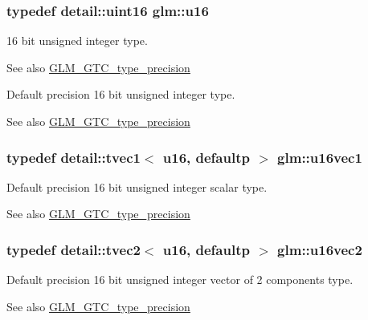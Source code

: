 \subsubsection[{\texorpdfstring{u16}{u16}}]{\setlength{\rightskip}{0pt plus 5cm}typedef detail\+::uint16 {\bf glm\+::u16}}\hypertarget{group__gtc__type__precision_gae7a1571503f83d2264ddfa705a6b082a}{}\label{group__gtc__type__precision_gae7a1571503f83d2264ddfa705a6b082a}
16 bit unsigned integer type. \begin{DoxySeeAlso}{See also}
\hyperlink{group__gtc__type__precision}{G\+L\+M\+\_\+\+G\+T\+C\+\_\+type\+\_\+precision}
\end{DoxySeeAlso}
Default precision 16 bit unsigned integer type. \begin{DoxySeeAlso}{See also}
\hyperlink{group__gtc__type__precision}{G\+L\+M\+\_\+\+G\+T\+C\+\_\+type\+\_\+precision} 
\end{DoxySeeAlso}
\subsubsection[{\texorpdfstring{u16vec1}{u16vec1}}]{\setlength{\rightskip}{0pt plus 5cm}typedef detail\+::tvec1$<$ u16, defaultp $>$ {\bf glm\+::u16vec1}}\hypertarget{group__gtc__type__precision_ga95324b9d781c51a6d31b05fcc63c5cbe}{}\label{group__gtc__type__precision_ga95324b9d781c51a6d31b05fcc63c5cbe}
Default precision 16 bit unsigned integer scalar type. \begin{DoxySeeAlso}{See also}
\hyperlink{group__gtc__type__precision}{G\+L\+M\+\_\+\+G\+T\+C\+\_\+type\+\_\+precision} 
\end{DoxySeeAlso}
\subsubsection[{\texorpdfstring{u16vec2}{u16vec2}}]{\setlength{\rightskip}{0pt plus 5cm}typedef detail\+::tvec2$<$ u16, defaultp $>$ {\bf glm\+::u16vec2}}\hypertarget{group__gtc__type__precision_ga4beac509930099bb494b4bd0a44c49f2}{}\label{group__gtc__type__precision_ga4beac509930099bb494b4bd0a44c49f2}
Default precision 16 bit unsigned integer vector of 2 components type. \begin{DoxySeeAlso}{See also}
\hyperlink{group__gtc__type__precision}{G\+L\+M\+\_\+\+G\+T\+C\+\_\+type\+\_\+precision} 
\end{DoxySeeAlso}
